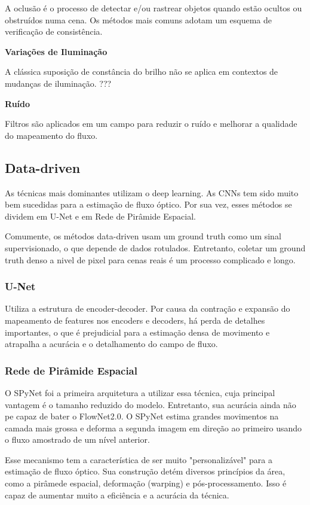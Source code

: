 \documentclass[12pt, a4paper]{article}
\begin{document}
A oclusão é o processo de detectar e/ou rastrear objetos quando estão ocultos ou obstruídos numa cena. Os métodos mais comuns adotam um esquema de verificação de consistência.

\textbf{Variações de Iluminação}

A clássica suposição de constância do brilho não se aplica em contextos de mudanças de iluminação. ???

\textbf{Ruído}

Filtros são aplicados em um campo para reduzir o ruído e melhorar a qualidade do mapeamento do fluxo.

\subsection{Data-driven}

As técnicas mais dominantes utilizam o deep learning. As CNNs tem sido muito bem sucedidas para a estimação de fluxo óptico. Por sua vez, esses métodos se dividem em U-Net e em Rede de Pirâmide Espacial.

Comumente, os métodos data-driven usam um ground truth como um sinal supervisionado, o que depende de dados rotulados. Entretanto, coletar um ground truth denso a nivel de pixel para cenas reais é um processo complicado e longo.

\subsubsection{U-Net}

Utiliza a estrutura de encoder-decoder. Por causa da contração e expansão do mapeamento de features nos encoders e decoders, há perda de detalhes importantes, o que é prejudicial para a estimação densa de movimento e atrapalha a acurácia e o detalhamento do campo de fluxo.

\subsubsection{Rede de Pirâmide Espacial}

O SPyNet foi a primeira arquitetura a utilizar essa técnica, cuja principal vantagem é o tamanho reduzido do modelo. Entretanto, sua acurácia ainda não pe capaz de bater o FlowNet2.0. O SPyNet estima grandes movimentos na camada mais grossa e deforma a segunda imagem em direção ao primeiro usando o fluxo amostrado de um nível anterior.

Esse mecanismo tem a característica de ser muito "personalizável" para a estimação de fluxo óptico. Sua construção detém diversos princípios da área, como a pirâmede espacial, deformação (warping) e pós-processamento. Isso é capaz de aumentar muito a eficiência e a acurácia da técnica.
\end{document}
